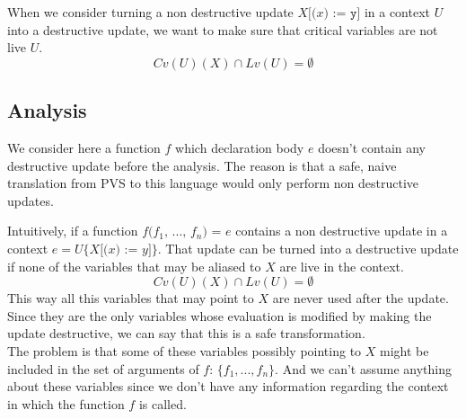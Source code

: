 \documentclass[12pt,a4paper]{article}
\newcommand{\cl}[1]{\texttt{#1}}
\newcommand{\ucont}[1]{\{#1\}}
\begin{document}
When we consider turning a non destructive update $X\cl{[(}x\cl{) := } \cl{y} \cl{]}$ in a context $U$ into a destructive update, we want to make sure that critical variables are not live $U$.
$$ Cv(U)(X) \cap Lv(U) = \emptyset $$




\subsection{Analysis}

We consider here a function $f$ which declaration body $e$ doesn't contain any destructive update before the analysis. The reason is that a safe, naive translation from PVS to this language would only perform non destructive updates.

Intuitively, if a function $f\cl{(}f_1\cl{, } ... \cl{, } f_n\cl{) = } e$ contains a non destructive update in a context $e = U\ucont{X\cl{[(}x\cl{) := }y\cl{]}}$. That update can be turned into a destructive update if none of the variables that may be aliased to $X$ are live in the context.
$$ Cv(U)(X) \cap Lv(U) = \emptyset $$
This way all this variables that may point to $X$ are never used after the update. Since they are the only variables whose evaluation is modified by making the update destructive, we can say that this is a safe transformation.\\

The problem is that some of these variables possibly pointing to $X$ might be included in the set of arguments of $f$: $\{f_1, ... , f_n\}$. And we can't assume anything about these variables since we don't have any information regarding the context in which the function $f$ is called.\\
\end{document}
